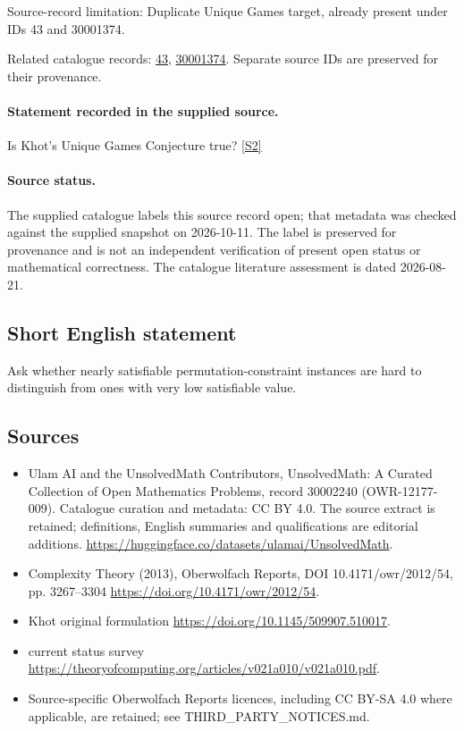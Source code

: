 \documentclass[11pt]{article}
\begin{document}
Source-record limitation: Duplicate Unique Games target, already present under IDs 43 and 30001374.

Related catalogue records: \href{https://mehmetmars7.github.io/Erdosproblems-llm-hunter/problem.html?type=open_problems&id=43}{43}, \href{https://mehmetmars7.github.io/Erdosproblems-llm-hunter/problem.html?type=open_problems&id=30001374}{30001374}. Separate source IDs are preserved for their provenance.
\paragraph{Statement recorded in the supplied source.}
Is Khot's Unique Games Conjecture true? \href{https://doi.org/10.4171/owr/2012/54}{[S2]}
\paragraph{Source status.}
The supplied catalogue labels this source record open; that metadata was checked against the supplied snapshot on 2026-10-11. The label is preserved for provenance and is not an independent verification of present open status or mathematical correctness. The catalogue literature assessment is dated 2026-08-21.
\subsection{Short English statement}
Ask whether nearly satisfiable permutation-constraint instances are hard to distinguish from ones with very low satisfiable value.
\subsection{Sources}
\begin{itemize}
\item[S1] Ulam AI and the UnsolvedMath Contributors, UnsolvedMath: A Curated Collection of Open Mathematics Problems, record 30002240 (OWR-12177-009). Catalogue curation and metadata: CC BY 4.0. The source extract is retained; definitions, English summaries and qualifications are editorial additions.
\url{https://huggingface.co/datasets/ulamai/UnsolvedMath}.
\item[S2] Complexity Theory (2013), Oberwolfach Reports, DOI 10.4171/owr/2012/54, pp. 3267--3304
\url{https://doi.org/10.4171/owr/2012/54}.
\item[S3] Khot original formulation
\url{https://doi.org/10.1145/509907.510017}.
\item[S4] current status survey
\url{https://theoryofcomputing.org/articles/v021a010/v021a010.pdf}.
\item Source-specific Oberwolfach Reports licences, including CC BY-SA 4.0 where applicable, are retained; see THIRD\_PARTY\_NOTICES.md.
\end{itemize}
\end{document}
